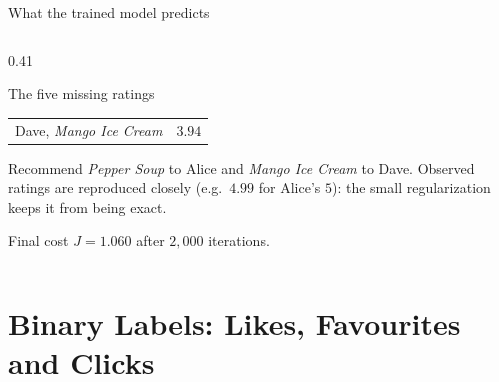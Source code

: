 \documentclass[aspectratio=169,10pt]{beamer}
\begin{document}
\begin{frame}{What the trained model predicts}
\begin{columns}[T,onlytextwidth]
\begin{column}{0.41\textwidth}
\begin{block}{The five missing ratings}
\begin{tabular}{@{}lr@{}}
          Dave, \emph{Mango Ice Cream}  & $3.94$\\
        \end{tabular}
      \end{block}
      \begin{keyidea}
        Recommend \emph{Pepper Soup} to Alice and \emph{Mango Ice Cream} to Dave.
        Observed ratings are reproduced closely (e.g.\ $4.99$ for Alice's $5$): the
        small regularization keeps it from being exact.
      \end{keyidea}
      Final cost $J = 1.060$ after $2{,}000$ iterations.
    \end{column}
  \end{columns}
\end{frame}

\section{Binary Labels: Likes, Favourites and Clicks}
\end{document}

